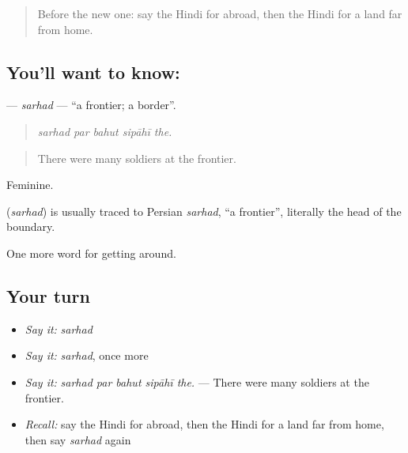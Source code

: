 \label{lesson:HI-C412-sarhad}



\begin{quote}
Before the new one: say the Hindi for abroad, then the Hindi for a land far from home.
\end{quote}

\subsection*{You'll want to know: }
\textbf{} — \emph{sarhad} — \textquotedblleft{}a frontier; a border\textquotedblright{}.

\begin{quote}
    
\end{quote}

\begin{quote}
\emph{sarhad par bahut sipāhī the.}
\end{quote}

\begin{quote}
There were many soldiers at the frontier.
\end{quote}

Feminine.

\begin{cousinweb}
\textbf{} (\emph{sarhad}) is usually traced to Persian \emph{sarhad}, \textquotedblleft{}a frontier\textquotedblright{}, literally the head of the boundary.
\end{cousinweb}

\begin{grammarlens}[title={What you've built}]
One more word for getting around.
\end{grammarlens}

\subsection*{Your turn}
\begin{itemize}
\raggedright
  \item \emph{Say it:} \emph{sarhad}
  \item \emph{Say it:} \emph{sarhad}, once more
  \item \emph{Say it:} \emph{sarhad par bahut sipāhī the.} — There were many soldiers at the frontier.
  \item \emph{Recall:} say the Hindi for abroad, then the Hindi for a land far from home, then say \emph{sarhad} again
\end{itemize}

